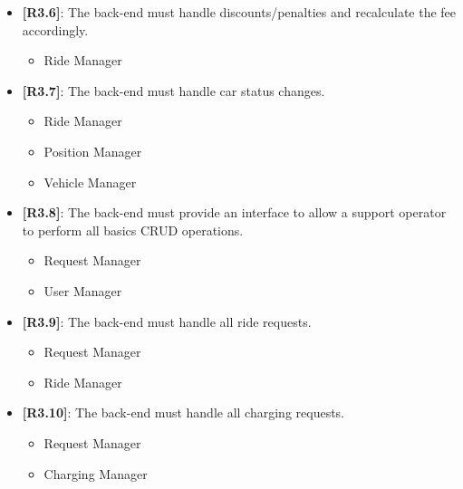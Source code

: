 \begin{itemize}
	\item {\textbf{[R3.6]}}: The back-end must handle discounts/penalties and recalculate the fee accordingly.
	\begin{itemize}
	\item Ride Manager\\
	\end{itemize}

	\item {\textbf{[R3.7]}}: The back-end must handle car status changes.
	\begin{itemize}
	\item Ride Manager
	\item Position Manager
	\item Vehicle Manager
	\end{itemize}
	
	\item {\textbf{[R3.8]}}: The back-end must provide an interface to allow a support operator to perform all basics CRUD operations.
	\begin{itemize}
	\item Request Manager
	\item User Manager\\
	\end{itemize}
	
	\item \textbf{[R3.9]}: The back-end must handle all ride requests.
	\begin{itemize}
	\item Request Manager
	\item Ride Manager
	\end{itemize}
	
	\item \textbf{[R3.10]}: The back-end must handle all charging requests.
	\begin{itemize}
	\item Request Manager
	\item Charging Manager
	\end{itemize}

\end{itemize}






